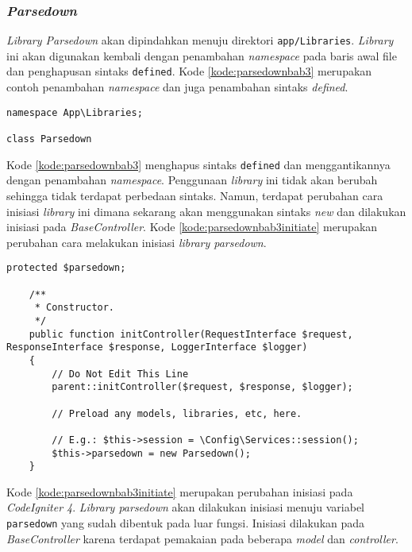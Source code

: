 \subsubsection{\textit{Parsedown}}
\textit{Library Parsedown} akan dipindahkan menuju direktori \texttt{app/Libraries}. \textit{Library} ini akan digunakan kembali dengan penambahan \textit{namespace} pada baris awal file dan penghapusan sintaks \texttt{defined}.  Kode \ref{kode:parsedownbab3} merupakan contoh penambahan \textit{namespace} dan juga penambahan sintaks \textit{defined}.
\begin{lstlisting}[caption=Perancangan perubahan \textit{library Parsedown} pada \textit{CodeIgniter 4}, label=kode:parsedownbab3]
namespace App\Libraries;

class Parsedown
\end{lstlisting}
Kode \ref{kode:parsedownbab3} menghapus sintaks \texttt{defined} dan menggantikannya dengan penambahan \textit{namespace}. Penggunaan \textit{library} ini tidak akan berubah sehingga tidak terdapat perbedaan sintaks. Namun, terdapat perubahan cara inisiasi \textit{library} ini dimana sekarang akan menggunakan sintaks \textit{new} dan dilakukan inisiasi pada \textit{BaseController}. Kode \ref{kode:parsedownbab3initiate} merupakan perubahan cara melakukan inisiasi \textit{library parsedown}.

\begin{lstlisting}[caption=Perancangan perubahan inisiasi \textit{library Parsedown} pada \textit{controller CodeIgniter 4}, label=kode:parsedownbab3initiate]
 	protected $parsedown;

    /**
     * Constructor.
     */
    public function initController(RequestInterface $request, ResponseInterface $response, LoggerInterface $logger)
    {
        // Do Not Edit This Line
        parent::initController($request, $response, $logger);

        // Preload any models, libraries, etc, here.

        // E.g.: $this->session = \Config\Services::session();
        $this->parsedown = new Parsedown();
    }
\end{lstlisting}

Kode \ref{kode:parsedownbab3initiate} merupakan perubahan inisiasi pada \textit{CodeIgniter 4}. \textit{Library parsedown} akan dilakukan inisiasi menuju variabel \texttt{parsedown} yang sudah dibentuk pada luar fungsi. Inisiasi dilakukan pada \textit{BaseController} karena terdapat pemakaian pada beberapa \textit{model} dan \textit{controller}. 


